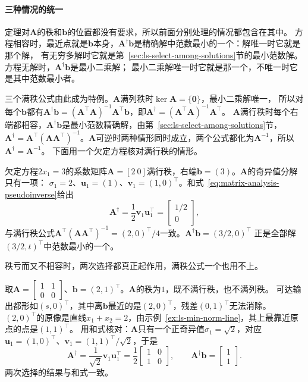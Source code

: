 \paragraph{三种情况的统一}

定理对$\bm A$的秩和$\bm b$的位置都没有要求，所以前面分别处理的情况都包含在其中。
方程相容时，最近点就是$\bm b$本身，$\bm A^\dagger\bm b$是精确解中范数最小的一个：解唯一时它就是那个解，
有无穷多解时它就是第~\ref{sec:ls-select-among-solutions}节的最小范数解。方程无解时，$\bm A^\dagger\bm b$是最小二乘解；
最小二乘解唯一时它就是那一个，不唯一时它是其中范数最小者。

三个满秩公式由此成为特例。$\bm A$满列秩时$\ker\bm A=\{\bm0\}$，最小二乘解唯一，
所以对每个$\bm b$都有$\bm A^\dagger\bm b=(\bm A^\top\bm A)^{-1}\bm A^\top\bm b$，即$\bm A^\dagger=(\bm A^\top\bm A)^{-1}\bm A^\top$。
$\bm A$满行秩时每个右端都相容，$\bm A^\dagger\bm b$是最小范数精确解，由第~\ref{sec:ls-select-among-solutions}节，
$\bm A^\dagger=\bm A^\top(\bm A\bm A^\top)^{-1}$。$\bm A$可逆时两种情形同时成立，两个公式都化为$\bm A^{-1}$，所以$\bm A^\dagger=\bm A^{-1}$。
下面用一个欠定方程核对满行秩的情形。

\begin{example}[欠定方程的伪逆]
\label{ex:ls-pinv-underdetermined}
欠定方程$2x_1=3$的系数矩阵$\bm A=[2\ 0]$满行秩，右端$\bm b=(3)$。$\bm A$的奇异值分解只有一项：
$\sigma_1=2$、$\bm u_1=(1)$、$\bm v_1=(1,0)^\top$。和式~\eqref{eq:matrix-analysis-pseudoinverse}给出
\[
 \bm A^\dagger=\frac12\bm v_1\bm u_1^\top=\begin{bmatrix}1/2\\0\end{bmatrix},
\]
与满行秩公式$\bm A^\top(\bm A\bm A^\top)^{-1}=(2,0)^\top/4$一致。$\bm A^\dagger\bm b=(3/2,0)^\top$
正是全部解$(3/2,t)^\top$中范数最小的一个。
\end{example}

秩亏而又不相容时，两次选择都真正起作用，满秩公式一个也用不上。

\begin{example}[秩亏且不相容时的两次选择]
\label{ex:ls-pinv-two-selections}
取$\bm A=\left[\begin{smallmatrix}1&1\\0&0\end{smallmatrix}\right]$、$\bm b=(2,1)^\top$。$\bm A$的秩为$1$，既不满行秩，也不满列秩。
可达输出都形如$(s,0)^\top$，其中离$\bm b$最近的是$(2,0)^\top$，残差$(0,1)^\top$无法消除。
$(2,0)^\top$的原像是直线$x_1+x_2=2$，由示例~\ref{ex:ls-min-norm-line}，其上最靠近原点的点是$(1,1)^\top$。
用和式核对：$\bm A$只有一个正奇异值$\sigma_1=\sqrt2$，对应$\bm u_1=(1,0)^\top$、$\bm v_1=(1,1)^\top/\sqrt2$，于是
\[
 \bm A^\dagger=\frac1{\sqrt2}\bm v_1\bm u_1^\top=\frac12\begin{bmatrix}1&0\\1&0\end{bmatrix},\qquad
 \bm A^\dagger\bm b=\begin{bmatrix}1\\1\end{bmatrix}.
\]
两次选择的结果与和式一致。
\end{example}

